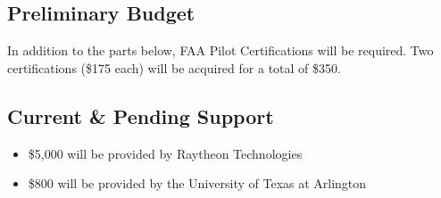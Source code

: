 
\subsection{Preliminary Budget}
In addition to the parts below, FAA Pilot Certifications will be required. Two certifications (\$175 each) will be acquired for a total of \$350.

\subsection{Current \& Pending Support}
\begin{itemize}
  \item \$5,000 will be provided by Raytheon Technologies
  \item \$800 will be provided by the University of Texas at Arlington
\end{itemize}